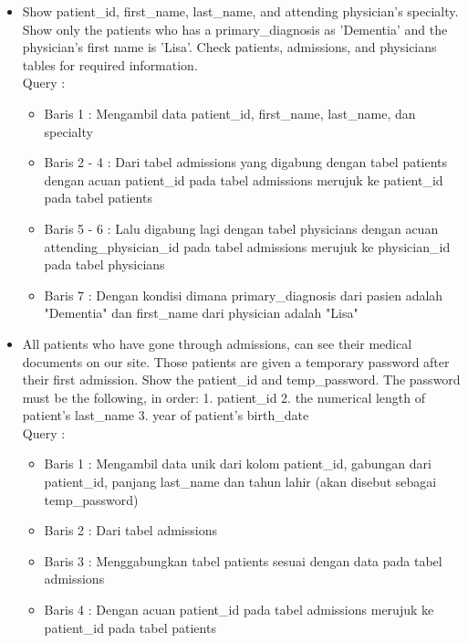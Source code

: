 \documentclass[]{article}
\begin{document}
\begin{itemize}
        \item Show patient\_id, first\_name, last\_name, and attending physician's specialty. Show only the patients who has a primary\_diagnosis as 'Dementia' and the physician's first name is 'Lisa'. Check patients, admissions, and physicians tables for required information.
        \\Query :
        
        \begin{itemize}
            \item Baris 1 : Mengambil data patient\_id, first\_name, last\_name, dan specialty
            \item Baris 2 - 4 : Dari tabel admissions yang digabung dengan tabel patients dengan acuan patient\_id pada tabel admissions merujuk ke patient\_id pada tabel patients
            \item Baris 5 - 6 : Lalu digabung lagi dengan tabel physicians dengan acuan attending\_physician\_id pada tabel admissions merujuk ke physician\_id pada tabel physicians
            \item Baris 7 : Dengan kondisi dimana primary\_diagnosis dari pasien adalah "Dementia" dan first\_name dari physician adalah "Lisa"
        \end{itemize}

        \item All patients who have gone through admissions, can see their medical documents on our site. Those patients are given a temporary password after their first admission. Show the patient\_id and temp\_password.
        The password must be the following, in order:
            1. patient\_id
            2. the numerical length of patient's last\_name
            3. year of patient's birth\_date
        \pagebreak
        \\Query :
        
        \begin{itemize}
            \item Baris 1 : Mengambil data unik dari kolom patient\_id, gabungan dari patient\_id, panjang last\_name dan tahun lahir (akan disebut sebagai temp\_password)
            \item Baris 2 : Dari tabel admissions
            \item Baris 3 : Menggabungkan tabel patients sesuai dengan data pada tabel admissions
            \item Baris 4 : Dengan acuan patient\_id pada tabel admissions merujuk ke patient\_id pada tabel patients
        \end{itemize}


\end{itemize}
\end{document}
